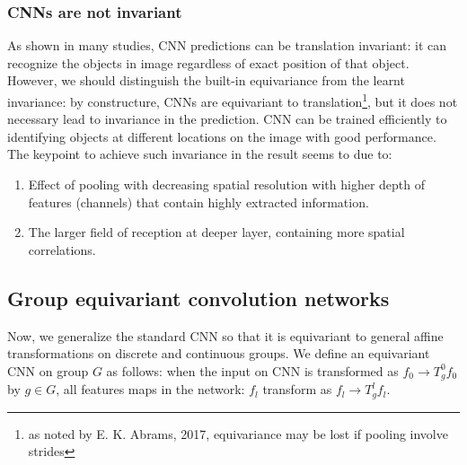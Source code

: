 \documentclass{IEEEtran}
\begin{document}
\subsubsection*{CNNs are not invariant}
As shown in many studies, CNN predictions can be translation invariant: it can recognize the objects in 
image regardless of exact position of that object. However, we should distinguish the built-in equivariance 
from the learnt invariance\cite{kauderer-abrams_quantifying_2017}: 
by constructure, CNNs are equivariant to translation\footnote{as noted by E. K. Abrams, 2017, equivariance may be lost if pooling involve strides}, 
but it does not necessary lead to invariance in the prediction. 
CNN can be trained efficiently to identifying objects at different locations on the image with good performance.
The keypoint to achieve such invariance in the result seems to due to:
\begin{enumerate}
    \item Effect of pooling with decreasing spatial resolution with higher depth of features (channels) that contain highly extracted information.
    \item The larger field of reception at deeper layer, containing more spatial correlations. 
\end{enumerate}

\subsection{Group equivariant convolution networks}

Now, we generalize the standard CNN so that it is equivariant to general affine transformations 
on discrete and continuous groups. We define an equivariant CNN on group $G$ as follows: 
when the input on CNN is transformed as $f_0\to T_g^0f_0$ by $g\in G$, all features maps 
in the network: $f_l$ transform as $f_l \to T_g^lf_l$. 

\end{document}
